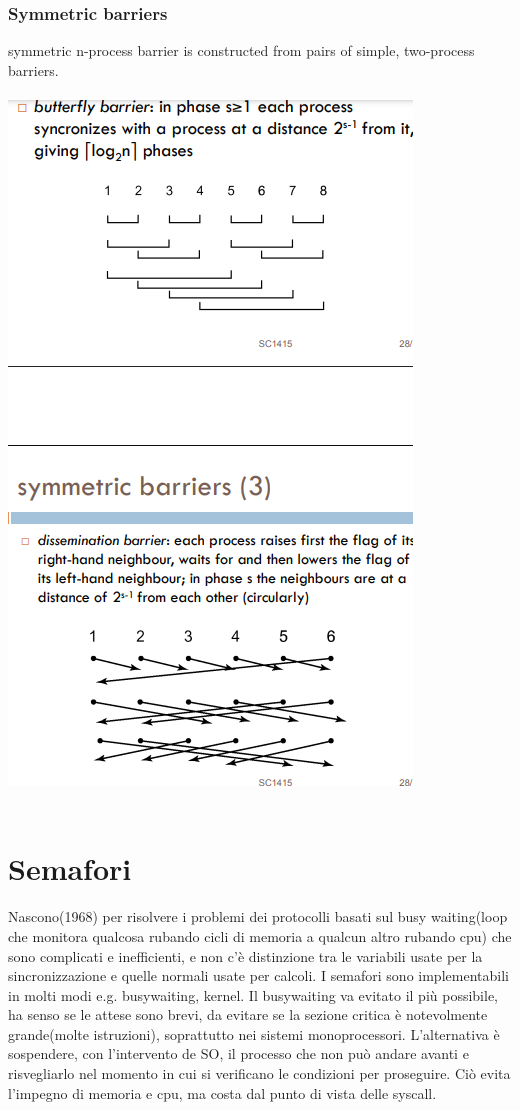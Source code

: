 \documentclass[10pt,a4paper]{book}
\begin{document}
\subsection{Symmetric barriers}
symmetric n-process barrier is constructed from pairs of simple, two-process barriers.\\ \\ 
\includegraphics[scale=0.7]{img/butterfly.png} \\ \\

\chapter{Semafori}
Nascono(1968) per risolvere i problemi dei protocolli basati sul busy waiting(loop che monitora qualcosa rubando cicli di memoria a qualcun altro rubando cpu) che sono complicati e inefficienti, e non c'è distinzione tra le variabili usate per la sincronizzazione e quelle normali usate per calcoli.
I semafori sono implementabili in molti modi e.g. busywaiting, kernel.
Il busywaiting va evitato il più possibile, ha senso se le attese sono brevi, da evitare se la sezione critica è notevolmente grande(molte istruzioni), soprattutto nei sistemi monoprocessori.
L'alternativa è sospendere, con l'intervento de SO, il processo che non può andare avanti e risvegliarlo nel momento in cui si verificano le condizioni per proseguire. Ciò evita l'impegno di memoria e cpu, ma costa dal punto di vista delle syscall.
\end{document}
